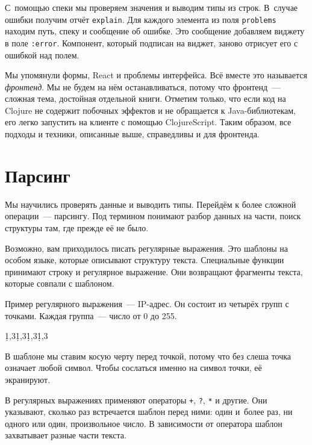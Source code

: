 С~помощью спеки мы проверяем значения и выводим типы из строк. В~случае ошибки
получим отчёт \verb|explain|. Для каждого элемента из поля \verb|problems|
находим путь, спеку и сообщение об ошибке. Это сообщение добавляем виджету в
поле \verb|:error|. Компонент, который подписан на виджет, заново отрисует его с
ошибкой над полем.


Мы упомянули формы, React и проблемы интерфейса. Всё вместе это называется
\emph{фронтенд}. Мы не будем на нём останавливаться, потому что фронтенд~---
сложная тема, достойная отдельной книги. Отметим только, что если код на Clojure
не содержит побочных эффектов и не обращается к Java-библиотекам, его легко
запустить на клиенте с помощью ClojureScript. Таким образом, все подходы и
техники, описанные выше, справедливы и для фронтенда.

\section{Парсинг}

Мы научились проверять данные и выводить типы. Перейдём к более сложной
операции~--- парсингу. Под термином понимают разбор данных на части, поиск
структуры там, где прежде её не было.

Возможно, вам приходилось писать регулярные выражения. Это шаблоны на особом
языке, которые описывают структуру текста. Специальные функции принимают строку
и регулярное выражение. Они возвращают фрагменты текста, которые совпали с
шаблоном.

Пример регулярного выражения~--- IP-адрес. Он состоит из четырёх групп с
точками. Каждая группа~--- число от 0 до 255.


\begin{english}
  \begin{text}
\d{1,3}\.\d{1,3}\.\d{1,3}\.\d{1,3}
  \end{text}
\end{english}

В шаблоне мы ставим косую черту перед точкой, потому что без слеша точка
означает любой символ. Чтобы сослаться именно на символ точки, её экранируют.

В регулярных выражениях применяют операторы \verb|+|, \verb|?|, \verb|*| и
другие. Они указывают, сколько раз встречается шаблон перед ними: один и~более
раз, ни одного или один, произвольное число. В зависимости от оператора шаблон
захватывает разные части текста.

